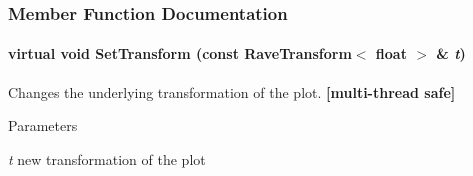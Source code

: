 \subsubsection{Member Function Documentation}
\hypertarget{classOpenRAVE_1_1GraphHandle_a1e4f3343130d6f10fba4b13f3be3913d}{
\paragraph[{SetTransform}]{\setlength{\rightskip}{0pt plus 5cm}virtual void SetTransform (const RaveTransform$<$ float $>$ \& {\em t})}\hfill}
\label{classOpenRAVE_1_1GraphHandle_a1e4f3343130d6f10fba4b13f3be3913d}


Changes the underlying transformation of the plot. {\bfseries \mbox{[}multi-\/thread safe\mbox{]}} 


\begin{DoxyParams}{Parameters}
\item[{\em t}]new transformation of the plot \end{DoxyParams}
